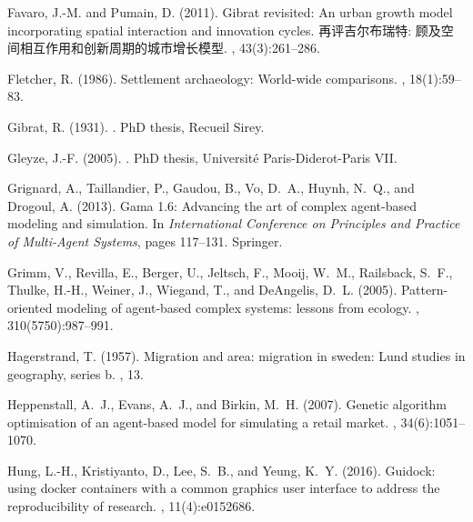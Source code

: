 \documentclass[10pt]{article}
\begin{document}
\begin{thebibliography}{}
Favaro, J.-M. and Pumain, D. (2011).
\newblock Gibrat revisited: An urban growth model incorporating spatial
  interaction and innovation cycles. 再评吉尔布瑞特:
  顾及空间相互作用和创新周期的城市增长模型.
, 43(3):261--286.

Fletcher, R. (1986).
\newblock Settlement archaeology: World-wide comparisons.
, 18(1):59--83.

Gibrat, R. (1931).
.
\newblock PhD thesis, Recueil Sirey.

Gleyze, J.-F. (2005).
.
\newblock PhD thesis, Universit{\'e} Paris-Diderot-Paris VII.

Grignard, A., Taillandier, P., Gaudou, B., Vo, D.~A., Huynh, N.~Q., and
  Drogoul, A. (2013).
\newblock Gama 1.6: Advancing the art of complex agent-based modeling and
  simulation.
\newblock In {\em International Conference on Principles and Practice of
  Multi-Agent Systems}, pages 117--131. Springer.

Grimm, V., Revilla, E., Berger, U., Jeltsch, F., Mooij, W.~M., Railsback,
  S.~F., Thulke, H.-H., Weiner, J., Wiegand, T., and DeAngelis, D.~L. (2005).
\newblock Pattern-oriented modeling of agent-based complex systems: lessons
  from ecology.
, 310(5750):987--991.

Hagerstrand, T. (1957).
\newblock Migration and area: migration in sweden: Lund studies in geography,
  series b.
, 13.

Heppenstall, A.~J., Evans, A.~J., and Birkin, M.~H. (2007).
\newblock Genetic algorithm optimisation of an agent-based model for simulating
  a retail market.
,
  34(6):1051--1070.

Hung, L.-H., Kristiyanto, D., Lee, S.~B., and Yeung, K.~Y. (2016).
\newblock Guidock: using docker containers with a common graphics user
  interface to address the reproducibility of research.
, 11(4):e0152686.


\end{thebibliography}
\end{document}
